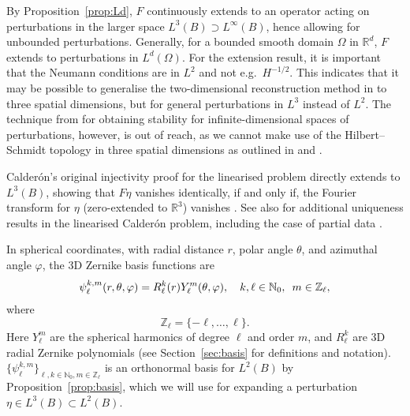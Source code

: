 \documentclass[reqno]{amsart}
\numberwithin{equation}{section}
\numberwithin{figure}{section}
\numberwithin{table}{section}
\theoremstyle{plain}
\theoremstyle{definition}
\theoremstyle{remark}
\newcommand{\R}{\mathbb{R}}
\newcommand{\N}{\mathbb{N}}
\newcommand{\Z}{\mathbb{Z}}
\begin{document}
By Proposition~\ref{prop:Ld}, $F$ continuously extends to an operator acting on perturbations in the larger space $L^3(B)\supset L^\infty(B)$, hence allowing for unbounded perturbations. Generally, for a bounded smooth domain $\Omega$ in $\R^d$, $F$ extends to perturbations in $L^d(\Omega)$. For the extension result, it is important that the Neumann conditions are in $L^2$ and not e.g.\ $H^{-1/2}$. This indicates that it may be possible to generalise the two-dimensional reconstruction method in \cite{Garde2024a} to three spatial dimensions, but for general perturbations in $L^3$ instead of $L^2$. The technique from \cite{Garde2024a} for obtaining stability for infinite-dimensional spaces of perturbations, however, is out of reach, as we cannot make use of the Hilbert--Schmidt topology in three spatial dimensions as outlined in \cite[Section~1.3]{Garde2024a} and \cite[Appendix~A]{Garde2022a}. 

Calder\'on's original injectivity proof for the linearised problem directly extends to $L^3(B)$, showing that $F\eta$ vanishes identically, if and only if, the Fourier transform for $\eta$ (zero-extended to $\R^3$) vanishes \cite{Calderon1980}. See also \cite{Ferreira2009,Ferreira2020,Sharafutdinov2009,Sjostrand2016} for additional uniqueness results in the linearised Calder\'on problem, including the case of partial data \cite{Ferreira2009,Sjostrand2016}.

In spherical coordinates, with radial distance $r$, polar angle $\theta$, and azimuthal angle $\varphi$, the 3D Zernike basis functions are
%
\begin{equation} \label{eq:basis}
   \psi_{\ell}^{k,m} (r, \theta, \varphi) = R_\ell^k(r) Y_\ell^m(\theta,\varphi), \quad k,\ell\in\N_0,\enskip m\in\Z_\ell,
\end{equation}
%
where 
%
\begin{equation*}
   \Z_\ell = \{-\ell,\dots,\ell\}.
\end{equation*}
%
Here $Y_\ell^m$ are the spherical harmonics of degree $\ell$ and order $m$, and $R_\ell^k$ are 3D radial Zernike polynomials (see Section~\ref{sec:basis} for definitions and notation).  $\{\psi_\ell^{k,m}\}_{\ell,k\in\N_0, m\in\Z_\ell}$ is an orthonormal basis for $L^2(B)$ by Proposition~\ref{prop:basis}, which we will use for expanding a perturbation $\eta\in L^3(B)\subset L^2(B)$.
\end{document}
